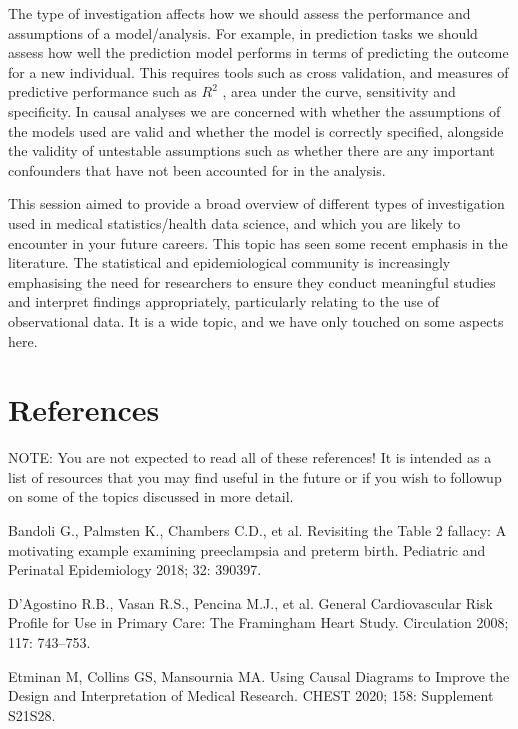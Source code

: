 \documentclass[letterpaper,10pt,english]{jupyterBook}
\begin{document}
\sphinxAtStartPar
The type of investigation affects how we should assess the performance and assumptions of a model/analysis. For example, in prediction tasks we should assess how well the prediction model performs in terms of predicting the outcome for a new individual. This requires tools such as cross validation, and measures of predictive performance such as \(R^2\) , area under the curve, sensitivity and specificity. In causal analyses we are concerned with whether the assumptions of the models used are valid and whether the model is correctly specified, alongside the validity of untestable assumptions such as whether there are any important confounders that have not been accounted for in the analysis.

\sphinxAtStartPar
This session aimed to provide a broad overview of different types of investigation used in medical statistics/health data science, and which you are likely to encounter in your future careers. This topic has seen some recent emphasis in the literature. The statistical and epidemiological community is increasingly emphasising the need for researchers to ensure they conduct meaningful studies and interpret findings appropriately, particularly relating to the use of observational data. It is a wide topic, and we have only touched on some aspects here.


\section{References}
\label{\detokenize{11.h. Types of Investigation:references}}\label{\detokenize{11.h. Types of Investigation::doc}}
\sphinxAtStartPar
NOTE: You are not expected to read all of these references! It is intended as a list of resources that you may find useful in the future or if you wish to follow\sphinxhyphen{}up on some of the topics discussed in more detail.

\sphinxAtStartPar
Bandoli G., Palmsten K., Chambers C.D., et al. Revisiting the Table 2 fallacy: A motivating example examining preeclampsia and preterm birth. Pediatric and Perinatal Epidemiology 2018; 32: 390\sphinxhyphen{}397.

\sphinxAtStartPar
D’Agostino R.B., Vasan R.S., Pencina M.J., et al. General Cardiovascular Risk Profile for Use in Primary Care: The Framingham Heart Study. Circulation 2008; 117: 743–753.

\sphinxAtStartPar
Etminan M, Collins GS, Mansournia MA. Using Causal Diagrams to Improve the Design and Interpretation of Medical Research. CHEST 2020; 158: Supplement S21\sphinxhyphen{}S28.
\end{document}
